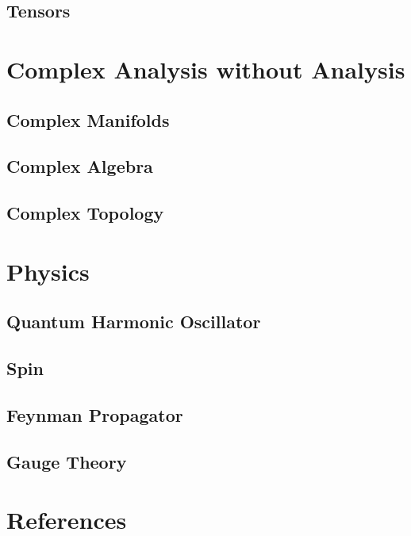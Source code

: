 \documentclass[12pt]{article}
\theoremstyle{definition}
\theoremstyle{remark}
\theoremstyle{example}
\begin{document}
\subsection{Tensors}

\section{Complex Analysis without Analysis}

\subsection{Complex Manifolds}

\subsection{Complex Algebra}

\subsection{Complex Topology}

\section{Physics}

\subsection{Quantum Harmonic Oscillator}

\subsection{Spin}

\subsection{Feynman Propagator}

\subsection{Gauge Theory}



\section{References}
\end{document}
